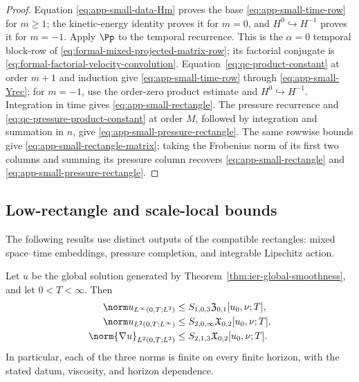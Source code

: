\begin{proof}
Equation \eqref{eq:app-small-data-Hm} proves the base
\eqref{eq:app-small-time-row} for \(m\ge1\); the kinetic-energy identity
proves it for \(m=0\), and \(H^0\hookrightarrow H^{-1}\) proves it for
\(m=-1\).  Apply \(\Pp\) to the temporal recurrence.
This is the \(\alpha=0\) temporal block-row of
\eqref{eq:formal-mixed-projected-matrix-row}; its factorial conjugate is
\eqref{eq:formal-factorial-velocity-convolution}.
Equation~\eqref{eq:qc-product-constant} at order \(m+1\) and induction give
\eqref{eq:app-small-time-row} through
\eqref{eq:app-small-Yrec}; for \(m=-1\), use the order-zero product
estimate and \(H^0\hookrightarrow H^{-1}\).  Integration in time gives
\eqref{eq:app-small-rectangle}.  The pressure recurrence and
\eqref{eq:qc-pressure-product-constant} at order \(M\), followed by
integration and summation in \(n\), give
\eqref{eq:app-small-pressure-rectangle}.  The same rowwise bounds give
\eqref{eq:app-small-rectangle-matrix}; taking the Frobenius norm of its first
two columns and summing its pressure column recovers
\eqref{eq:app-small-rectangle} and
\eqref{eq:app-small-pressure-rectangle}.
\end{proof}

\subsection{Low-rectangle and scale-local bounds}

The following results use distinct outputs of the compatible rectangles:
mixed space--time embeddings, pressure completion, and integrable Lipschitz
action.

\begin{proposition}
\label{prop:app-low-rectangle-classes}
Let \(u\) be the global solution generated by
Theorem~\ref{thm:ier-global-smoothness}, and let \(0<T<\infty\).  Then
\begin{align}
 \norm u_{L^\infty(0,T;L^3)}
 &\le S_{1,0,3}\mathfrak Z_{0,1}[u_0,\nu;T],
 \label{eq:app-LinfL3}\\
 \norm u_{L^2(0,T;L^\infty)}
 &\le S_{2,0,\infty}\mathfrak X_{0,2}[u_0,\nu;T],
 \label{eq:app-L2Linfty}\\
 \norm{\nabla u}_{L^2(0,T;L^3)}
 &\le S_{2,1,3}\mathfrak X_{0,2}[u_0,\nu;T].
 \label{eq:app-grad-L2L3}
\end{align}
In particular, each of the three norms is finite on every finite horizon,
with the stated datum, viscosity, and horizon dependence.
\end{proposition}

